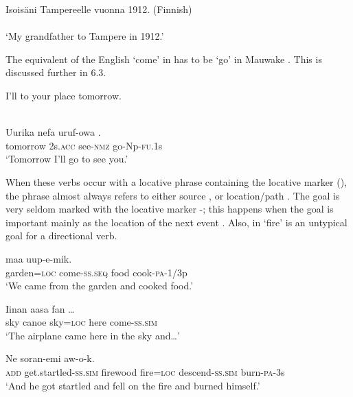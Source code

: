 \ea%
\label{ex:3:x282}
\gll Isois\"ani  Tampereelle vuonna 1912. (Finnish)\\ \\
\glt`My grandfather  to Tampere in 1912.' 
\z

The equivalent of the English `come' in  has to be `go' in Mauwake . This is discussed further in 6.3. 

\ea%
\label{ex:3:x283}
\gll I'll  to your place tomorrow. \\
\\
\z

\ea%
\label{ex:3:x284}
\gll Uurika nefa uruf-owa . \\
tomorrow 2s.\textsc{acc} see-\textsc{nmz} go-Np-\textsc{fu}.1s \\
\glt`Tomorrow I'll go to see you.'
\z

When these verbs occur with a locative phrase containing the locative marker (), the phrase almost always refers to either source , or location/path . The goal is very seldom marked with the locative marker -; this happens when the goal is important mainly as the location of the next event . Also, in   `fire' is an untypical goal for a directional verb.

\ea%
\label{ex:3:x285}
\gll {}  maa uup-e-mik. \\
garden=\textsc{loc} come-\textsc{ss}.\textsc{seq} food cook-\textsc{pa}-1/3p \\
\glt`We came from the garden and cooked food.'
\z

\ea%
\label{ex:3:x447}
\gll Iinan aasa  fan  {\dots} \\
sky canoe sky=\textsc{loc} here come-\textsc{ss}.\textsc{sim}\\
\glt`The airplane came here in the sky and{\dots}'
\z

\ea%
\label{ex:3:x1878}
\gll Ne soran-emi  \textstyleEmphasizedVernacularWords{=} \textstyleEmphasizedVernacularWords{-} aw-o-k.
\\
\textsc{add} get.startled-\textsc{ss}.\textsc{sim} firewood fire=\textsc{loc} descend-\textsc{ss}.\textsc{sim} burn-\textsc{pa}-3s\\
\glt`And he got startled and fell on the fire and burned himself.'
\z

